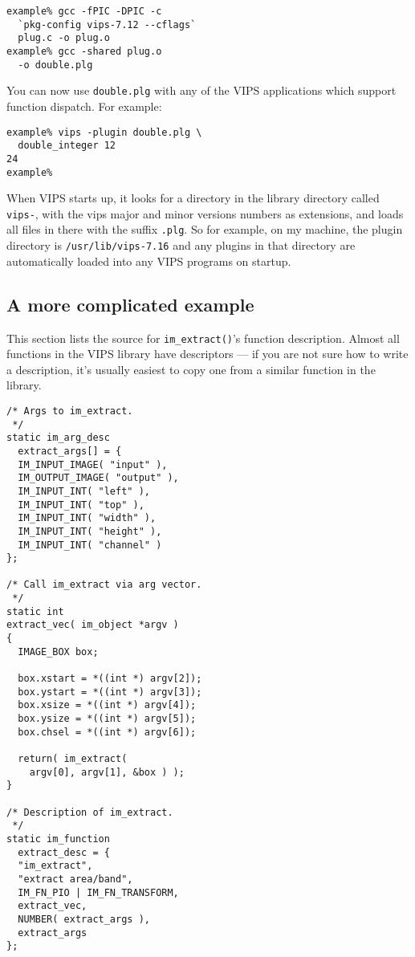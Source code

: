 \begin{verbatim}
example% gcc -fPIC -DPIC -c 
  `pkg-config vips-7.12 --cflags` 
  plug.c -o plug.o
example% gcc -shared plug.o 
  -o double.plg
\end{verbatim}

You can now use \verb+double.plg+ with any of the VIPS applications which
support function dispatch. For example:

\begin{verbatim}
example% vips -plugin double.plg \
  double_integer 12
24
example%
\end{verbatim}

When VIPS starts up, it looks for a directory in the library directory called
\verb+vips-+, with the vips major and minor versions numbers as extensions,
and loads all files in there with the suffix \verb+.plg+. So for example, on
my machine, the plugin directory is \verb+/usr/lib/vips-7.16+ and any plugins
in that directory are automatically loaded into any VIPS programs on startup.

\subsection{A more complicated example}

This section lists the source for \verb+im_extract()+'s function
description. Almost all functions in the VIPS library have descriptors ---
if you are not sure how to write a description, it's usually easiest to
copy one from a similar function in the library.

\begin{verbatim}
/* Args to im_extract.
 */
static im_arg_desc 
  extract_args[] = {
  IM_INPUT_IMAGE( "input" ),
  IM_OUTPUT_IMAGE( "output" ),
  IM_INPUT_INT( "left" ),
  IM_INPUT_INT( "top" ),
  IM_INPUT_INT( "width" ),
  IM_INPUT_INT( "height" ),
  IM_INPUT_INT( "channel" )
};

/* Call im_extract via arg vector.
 */
static int
extract_vec( im_object *argv )
{
  IMAGE_BOX box;

  box.xstart = *((int *) argv[2]);
  box.ystart = *((int *) argv[3]);
  box.xsize = *((int *) argv[4]);
  box.ysize = *((int *) argv[5]);
  box.chsel = *((int *) argv[6]);

  return( im_extract( 
    argv[0], argv[1], &box ) );
}

/* Description of im_extract.
 */
static im_function 
  extract_desc = {
  "im_extract",
  "extract area/band",
  IM_FN_PIO | IM_FN_TRANSFORM, 
  extract_vec,      
  NUMBER( extract_args ),
  extract_args     
};
\end{verbatim}

